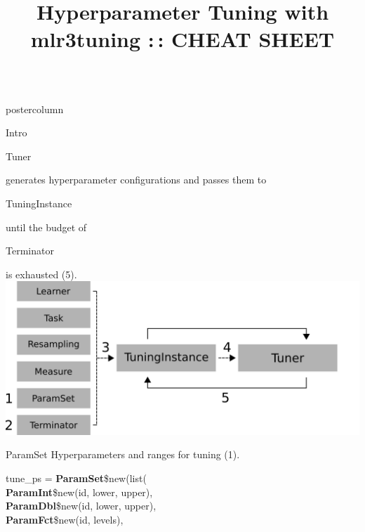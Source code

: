 \documentclass{beamer}
\title{Hyperparameter Tuning with mlr3tuning :\,: CHEAT SHEET} %
\newlength{\columnheight} %
\newcommand{\codeinline}[1]{\begin{codeboxinline}#1\end{codeboxinline}}
\begin{document}
\begin{frame}[fragile]{}
	\begin{columns}
		\begin{column}{.245\textwidth}
			\begin{beamercolorbox}[center]{postercolumn}
				\begin{minipage}{.98\textwidth}
					\parbox[t][\columnheight]{\textwidth}{
						\begin{myblock}{Intro}
							\codeinline{Tuner} generates hyperparameter configurations and passes them to \codeinline{TuningInstance} until the budget of \codeinline{Terminator} is exhausted (5). 
							\vspace{1em}
							\\
							\includegraphics[width=\textwidth]{img/tuning_objects.png}
						\end{myblock}
						\begin{myblock}{ParamSet}
					        Hyperparameters and ranges for tuning (1).
							\\
							\begin{codeboxmultiline}[width=21cm]
								tune\_ps = \textbf{ParamSet}\$new(list(\\
								\hspace*{1ex}\textbf{ParamInt}\$new(id, lower, upper),\\
								\hspace*{1ex}\textbf{ParamDbl}\$new(id, lower, upper),\\
								\hspace*{1ex}\textbf{ParamFct}\$new(id, levels),\\

\end{codeboxmultiline}
\end{myblock}}
\end{minipage}
\end{beamercolorbox}
\end{column}
\end{columns}
\end{frame}
\end{document}
